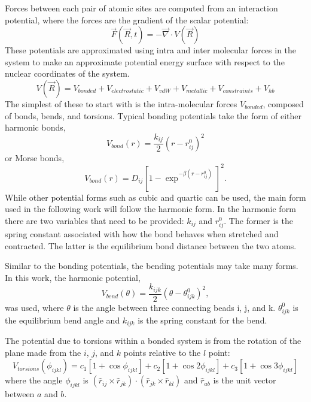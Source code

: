 Forces between each pair of atomic sites are computed from an interaction potential, where the forces are the gradient of the scalar potential:
\begin{equation}
\vec{F}(\vec{R},t) = -\vec{\nabla} \cdot V(\vec{R})
\end{equation}
These potentials are approximated using intra and inter molecular forces in the system to make an approximate potential energy surface with respect to the nuclear coordinates of the system.~\cite{Leach2001} 
\begin{equation}
   V(\vec{R}) = V_{bonded} + V_{electrostatic} + V_{vdW} + V_{metallic} +V_{constraints} + V_{hb}     
\end{equation}
The simplest of these to start with is the intra-molecular forces $V_{bonded}$, composed of bonds, bends, and torsions. Typical bonding potentials take the form of either harmonic bonds,
\begin{equation}
    V_{bond}(r) = \frac{k_{ij}}{2} (r - r_{ij}^0)^2
\end{equation}
or Morse bonds,
\begin{equation}
    V_{bond}(r) = D_{ij} [1 - \exp^{-\beta (r - r_{ij}^0)}]^2 .
\end{equation}
While other potential forms such as cubic and quartic can be used, the main form used in the following work will follow the harmonic form. In the harmonic form there are two variables that need to be provided: $k_{ij}$ and $r_{ij}^0$. The former is the spring constant associated with how the bond behaves when stretched and contracted. The latter is the equilibrium bond distance between the two atoms.

Similar to the bonding potentials, the bending potentials may take many forms. In this work, the harmonic potential,
\begin{equation}
    V_{bend} (\theta) = \frac{k_{ijk}}{2} (\theta - \theta_{ijk}^0)^2,
\end{equation}
was used, where $\theta$ is the angle between three connecting beads i, j, and k. $\theta_{ijk}^0$ is the equilibrium bend angle and $k_{ijk}$ is the spring constant for the bend.

The potential due to torsions within a bonded system is from the rotation of the plane made from the $i$, $j$, and $k$ points relative to the $l$ point:
\begin{equation}
    V_{torsions} (\phi_{ijkl})= c_1 [1 + \cos{\phi_{ijkl}}] + c_2 [1 + \cos{2\phi_{ijkl}}] + c_3 [1 + \cos{3\phi_{ijkl}}]  
\end{equation}
where the angle $\phi_{ijkl}$ is $(\hat{r}_{ij} \times \hat{r}_{jk}) \cdot (\hat{r}_{jk} \times \hat{r}_{kl})$ and $\hat{r}_{ab}$ is the unit vector between $a$ and $b$.


